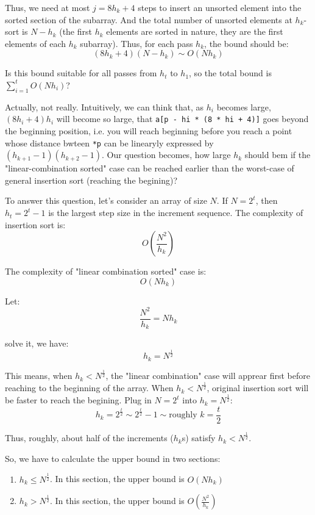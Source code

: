 \documentclass[12pt]{book}
\begin{document}
Thus, we need at most \(j = 8h_k + 4\) steps to insert an unsorted element into the sorted section of the subarray. And the total number of unsorted elements at \(h_k\)-sort is \(N - h_k\) (the first \(h_k\) elements are sorted in nature, they are the first elements of each \(h_k\) subarray). Thus, for each pass \(h_k\), the bound should be:
\[
(8h_k + 4)(N - h_k) \sim O(Nh_k)
\]

Is this bound suitable for all passes from \(h_t\) to \(h_1\), so the total bound is \(\sum_{i = 1}^{t}O(Nh_i)\)?

Actually, not really. Intuitively, we can think that, as \(h_i\) becomes large, \((8h_i + 4)h_i\) will become so large, that \texttt{a[p - hi * (8 * hi + 4)]} goes beyond the beginning position, i.e. you will reach beginning before you reach a point whose distance bwteen \texttt{*p} can be linearyly expressed by \((h_{k + 1} - 1)(h_{k + 2} - 1)\). Our question becomes, how large \(h_k\) should bem if the "linear-combination sorted" case can be reached earlier than the worst-case of general insertion sort (reaching the begining)?

To answer this question, let's consider an array of size \(N\). If \(N = 2^t\), then \(h_t = 2^t - 1\) is the largest step size in the increment sequence. The complexity of insertion sort is:
\[
O(\frac {N^2} {h_k})
\]

The complexity of "linear combination sorted" case is:
\[
O(Nh_k)
\]

Let:
\[
\frac {N^2} {h_k} = Nh_k
\]

solve it, we have:
\[
h_k = N^{\frac {1} {2}}
\]

This means, when \(h_k < N^{\frac {1} {2}}\), the "linear combination" case will apprear first before reaching to the beginning of the array. When \(h_k < N^{\frac {1} {2}}\), original insertion sort will be faster to reach the begining. Plug in \(N = 2^t\) into \(h_k = N^{\frac {1} {2}}\):
\[
h_k = 2^{\frac {t} {2}} \sim 2^{\frac {t} {2}} - 1 \sim \text {roughly } k = \frac {t} {2}
\]

Thus, roughly, about half of the increments (\(h_k\)s) satisfy \(h_k < N^{\frac {1} {2}}\).

So, we have to calculate the upper bound in two sections:
\begin{enumerate}
\item \(h_k \leq N^{\frac {1} {2}}\). In this section, the upper bound is \(O(Nh_k)\)
\item \(h_k > N^{\frac {1} {2}}\). In this section, the upper bound is \(O(\frac {N^2} {h_k})\)
\end{enumerate}
\end{document}
